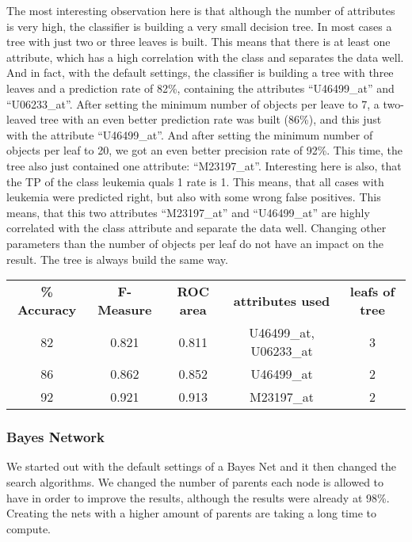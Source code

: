 \documentclass{sig-alternate-05-2015}
\begin{document}
{The most interesting observation here is that although the number of attributes is very high, the classifier is building a very small decision tree. In most cases a tree with just two or three leaves is built. This means that there is at least one attribute, which has a high correlation with the class and separates the data well. And in fact, with the default settings, the classifier is building a tree with three leaves and a prediction rate of 82\%, containing the attributes “U46499\_at” and “U06233\_at”. After setting the minimum number of objects per leave to 7, a two-leaved tree with an even better prediction rate was built (86\%), and this just with the attribute “U46499\_at”. And after setting the minimum number of objects per leaf to 20, we got an even better precision rate of 92\%. This time, the tree also just contained one attribute: “M23197\_at”. Interesting here is also, that the TP of the class leukemia quals 1 rate is 1. This means, that all cases with leukemia were predicted right, but also with some wrong false positives. This means, that this two attributes “M23197\_at” and “U46499\_at” are highly correlated with the class attribute and separate the data well. 
Changing other parameters than the number of objects per leaf do not have an impact on the result. The tree is always build the same way. 

\begin{center}
\begin{tabular}{ c | c | c | c |  c }
\textbf{\% Accuracy} & \textbf{F-Measure} & \textbf{ROC area} & \textbf{attributes used} & \textbf{leafs of tree}\\
82 & 0.821 & 0.811 & U46499\_at, U06233\_at & 3 \\
86 & 0.862 & 0.852 & U46499\_at & 2 \\
92 & 0.921 & 0.913 & M23197\_at & 2 \\
\end{tabular}
\end{center}

\subsubsection{Bayes Network}
We started out with the default settings of a Bayes Net and it then changed the search algorithms. We changed the number of parents each node is allowed to have in order to improve the results, although the results were already at 98\%. Creating the nets with a higher amount of parents are taking a long time to compute.

}
\end{document}
